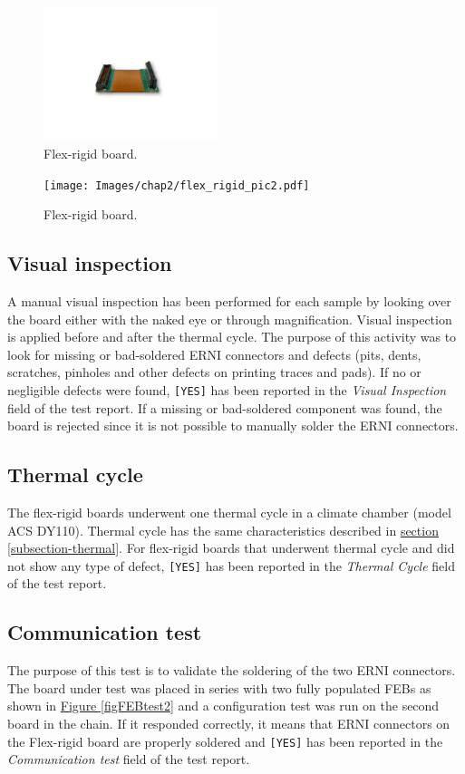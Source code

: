 \begin{figure}[h!]
    \centering
    \includegraphics[width=0.45\textwidth]{Images/chap2/flex_rigid_pic.pdf}
    \caption{Flex-rigid board.}
    \label{figDflexrigidPIC}
\end{figure}

\begin{figure}[h!]
    \centering
    \texttt{[image: Images/chap2/flex\_rigid\_pic2.pdf]}
    \caption{Flex-rigid board.}
    \label{figDflexrigidPICconnection}
\end{figure}

\subsection{Visual inspection}
A manual visual inspection has been performed for each sample by looking over the board either with the naked eye or through magnification. Visual inspection is applied before and after the thermal cycle. The purpose of this activity was to look for missing or bad-soldered ERNI connectors and defects (pits, dents, scratches, pinholes and other defects on printing traces and pads). If no or negligible defects were found, \texttt{[YES]} has been reported in the \textit{Visual Inspection} field of the test report. If a missing or bad-soldered component was found, the board is rejected since it is not possible to manually solder the ERNI connectors.

\subsection{Thermal cycle}
The flex-rigid boards underwent one thermal cycle in a climate chamber (model ACS DY110). Thermal cycle has the same characteristics described in \hyperref[subsection-thermal]{section \ref{subsection-thermal}}. For flex-rigid boards that underwent thermal cycle and did not show any type of defect, \texttt{[YES]} has been reported in the \textit{Thermal Cycle} field of the test report.

\subsection{Communication test}
The purpose of this test is to validate the soldering of the two ERNI connectors. The board under test was placed in series with two fully populated FEBs as shown in \hyperref[figFEBtest2]{Figure \ref{figFEBtest2}} and a configuration test was run on the second board in the chain. If it responded correctly, it means that ERNI connectors on the Flex-rigid board are properly soldered and \texttt{[YES]} has been reported in the \textit{Communication test} field of the test report. \\

